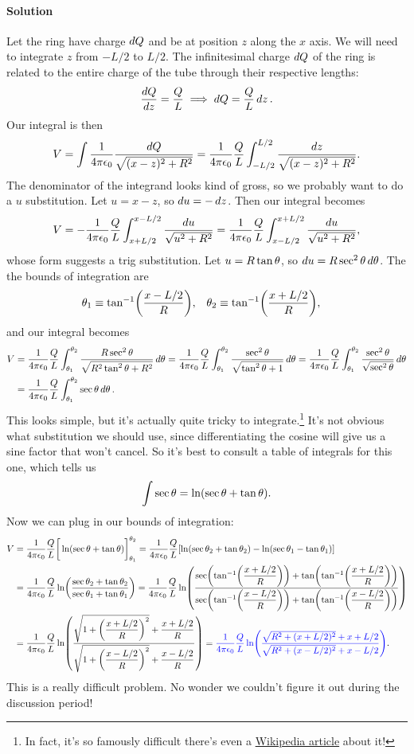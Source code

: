 \documentclass[11pt]{article}
\newcommand{\beq}{\begin{equation*}}
\newcommand{\eeq}{\end{equation*}}
\newenvironment{solution}
{
    \paragraph{Solution}
    \ignorespaces
}
{
    \bigskip
}
\begin{document}
\begin{solution}
\begin{enumerate}
		Let the ring have charge $\dd{Q}$ and be at position $z$ along the $x$ axis.  We will need to integrate $z$ from $-L/2$ to $L/2$.  The infinitesimal charge $\dd{Q}$ of the ring is related to the entire charge of the tube through their respective lengths:
		\beq
			\frac{\dQ}{\dz} = \frac{Q}{L} \implies \dQ = \frac{Q}{L} \dz.
		\eeq
		Our integral is then
		\beq
			V = \int \fk \frac{\dQ}{\sqrt{(x-z)^2 + R^2}}
			= \fk \frac{Q}{L} \int_{-L/2}^{L/2} \frac{\dz}{\sqrt{(x-z)^2 + R^2}}.
		\eeq
		The denominator of the integrand looks kind of gross, so we probably want to do a $u$ substitution.  Let $u = x - z$, so $\dd{u} = -\dd{z}$.  Then our integral becomes
		\beq
			V = -\fk \frac{Q}{L} \int_{x + L/2}^{x - L/2} \frac{\du}{\sqrt{u^2 + R^2}}
			= \fk \frac{Q}{L} \int_{x - L/2}^{x + L/2} \frac{\du}{\sqrt{u^2 + R^2}},
		\eeq
		whose form suggests a trig substitution.  Let $u = R \tan\theta$, so $\dd{u} = R \sec^2\theta \dd{\theta}$.  The the bounds of integration are
		\begin{align*}
			\theta_1 &\equiv \tan[-1](\frac{x - L/2}{R}), &
			\theta_2 &\equiv \tan[-1](\frac{x + L/2}{R}),
		\end{align*}
		and our integral becomes
		\begin{align*}
			V &= \frac{1}{4\pi\epsilon_0} \frac{Q}{L} \int_{\theta_1}^{\theta_2} \frac{R \sec^2\theta}{\sqrt{R^2 \tan^2\theta + R^2}} \dd{\theta}
			= \frac{1}{4\pi\epsilon_0} \frac{Q}{L} \int_{\theta_1}^{\theta_2} \frac{\sec^2\theta}{\sqrt{\tan^2\theta + 1}} \dd{\theta}
			= \frac{1}{4\pi\epsilon_0} \frac{Q}{L} \int_{\theta_1}^{\theta_2} \frac{\sec^2\theta}{\sqrt{\sec^2\theta}} \dd{\theta} \\
			&= \frac{1}{4\pi\epsilon_0} \frac{Q}{L} \int_{\theta_1}^{\theta_2} \sec\theta \dd{\theta}.
		\end{align*}
		This looks simple, but it's actually quite tricky to integrate.\footnote{In fact, it's so famously difficult there's even a \href{https://en.wikipedia.org/wiki/Integral_of_the_secant_function}{Wikipedia article} about it!}  It's not obvious what substitution we should use, since differentiating the cosine will give us a sine factor that won't cancel.  So it's best to consult a table of integrals for this one, which tells us
		\beq
			\int \sec\tht = \ln(\sec\tht + \tan\tht).
		\eeq
		Now we can plug in our bounds of integration:
		\begin{align*}
			V &= \frac{1}{4\pi\epsilon_0} \frac{Q}{L} \bigg[ \ln(\sec\theta + \tan\theta) \bigg]_{\theta_1}^{\theta_2}
			= \frac{1}{4\pi\epsilon_0} \frac{Q}{L} [ \ln(\sec\theta_2 + \tan\theta_2) - \ln(\sec\theta_1 - \tan\theta_1)] \\
			&= \frac{1}{4\pi\epsilon_0} \frac{Q}{L} \ln(\frac{\sec\theta_2 + \tan\theta_2}{\sec\theta_1 + \tan\theta_1})
			= \frac{1}{4\pi\epsilon_0} \frac{Q}{L} \ln(\frac{\sec(\tan[-1](\dfrac{x + L/2}{R})) + \tan(\tan[-1](\dfrac{x + L/2}{R}))}{\sec(\tan[-1](\dfrac{x - L/2}{R})) + \tan(\tan[-1](\dfrac{x - L/2}{R}))}) \\
			&= \frac{1}{4\pi\epsilon_0} \frac{Q}{L} \ln(\frac{\sqrt{1 + \left( \dfrac{x + L/2}{R} \right)^2} + \dfrac{x + L/2}{R}}{\sqrt{1 + \left( \dfrac{x - L/2}{R} \right)^2} + \dfrac{x - L/2}{R}})
			= {\color{blue} \frac{1}{4\pi\epsilon_0} \frac{Q}{L} \ln(\frac{\sqrt{R^2 + (x + L/2)^2} + x + L/2}{\sqrt{R^2 + (x - L/2)^2} + x - L/2})}.
		\end{align*}
		This is a really difficult problem.  No wonder we couldn't figure it out during the discussion period!
		

\end{enumerate}
\end{solution}
\end{document}
